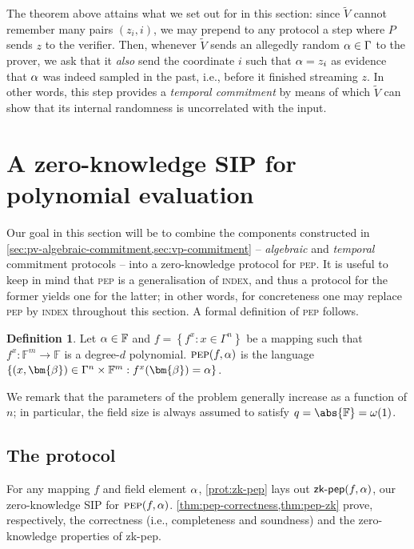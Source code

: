 \documentclass[a4paper,UKenglish,cleveref, autoref, thm-restate]{lipics-v2021}
\theoremstyle{definition}
\newtheorem{definition}[theorem]{Definition}
\newcommand{\field}{\mathbb{F}}
\renewcommand{\set}[1]{\left\{#1\right\}}
\newcommand{\indexproblem}{\normalfont\textsc{index}\xspace}
\newcommand{\pep}{\normalfont\textsc{pep}\xspace}
\newcommand{\vcommitstring}{z}
\newcommand{\dimension}{m}
\newcommand{\degree}{d}
\newcommand{\fieldsize}{q}
\newcommand{\evaluationpoint}{\bm{\fe2}}
\newcommand{\alphabet}{\Gamma}
\def\symbol#1{
    \ifnum#1=1
        \alpha
    \else
    \ifnum#1=2
        \beta
    \else
    \ifnum#1=3
        \gamma
    \fi\fi\fi
}
\def\fe#1{
    \ifnum#1=1
        \alpha
    \else
    \ifnum#1=2
        \beta
    \else
    \ifnum#1=3
        \gamma
    \fi\fi\fi
}
\begin{document}
The theorem above attains what we set out for in this section: since $\widetilde V$ cannot remember many pairs $(\vcommitstring_i, i)$, we may prepend to any protocol a step where $P$ sends $\vcommitstring$ to the verifier. Then, whenever $\widetilde V$ sends an allegedly random $\symbol1 \in \alphabet$ to the prover, we ask that it \emph{also} send the coordinate $i$ such that $\symbol1 = \vcommitstring_i$ as evidence that $\symbol1$ was indeed sampled in the past, i.e., before it finished streaming $\vcommitstring$. In other words, this step provides a \emph{temporal commitment} by means of which $\widetilde V$ can show that its internal randomness is uncorrelated with the input. 

\section{A zero-knowledge SIP for polynomial evaluation}
\label{sec:pep}

Our goal in this section will be to combine the components constructed in \cref{sec:pv-algebraic-commitment,sec:vp-commitment} -- \emph{algebraic} and \emph{temporal} commitment protocols -- into a zero-knowledge protocol for \pep. It is useful to keep in mind that \pep is a generalisation of \indexproblem, and thus a protocol for the former yields one for the latter; in other words, for concreteness one may replace \pep by \indexproblem throughout this section. A formal definition of \pep follows.

\begin{definition}
    \label{def:pep}
    Let $\fe1 \in \field$ and $f = \set{f^x : x \in \alphabet^n}$ be a mapping such that $f^x: \field^\dimension \to \field$ is a degree-$\degree$ polynomial. $\pep(f, \fe1)$ is the language $\set{(x, \evaluationpoint) \in \alphabet^n \times \field^\dimension : f^x(\evaluationpoint) = \fe1}$.
\end{definition}
We remark that the parameters of the problem generally increase as a function of $n$; in particular, the field size is always assumed to satisfy $\fieldsize = \abs{\field} = \omega(1)$.

\subsection{The protocol}

For any mapping $f$ and field element $\fe1$, \cref{prot:zk-pep} lays out $\textsf{zk-pep}(f, \fe1)$, our zero-knowledge SIP for $\pep(f, \fe1)$. \cref{thm:pep-correctness,thm:pep-zk} prove, respectively, the correctness (i.e., completeness and soundness) and the zero-knowledge properties of \textsf{zk-pep}.
\end{document}
